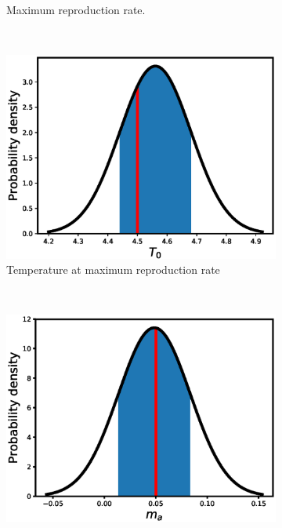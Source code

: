 \documentclass[12pt, table]{article}
\begin{document}
\begin{figure}[H]
\begin{subfigure}[b]{0.45\textwidth}
       \caption{Maximum reproduction  rate.}
       \label{fig2c}
   \end{subfigure}
   ~ %
   \begin{subfigure}[b]{0.45\textwidth}
       \includegraphics[width=1\textwidth, height=0.23\textheight]{figexple2/fT0}
        \caption{Temperature at maximum reproduction rate}
       \label{fig2d}
   \end{subfigure}\\
   \begin{subfigure}[b]{0.45\textwidth}
       \includegraphics[width=1\textwidth, height=0.24\textheight]{figexple2/fmj}

\end{subfigure}
\end{figure}
\end{document}
